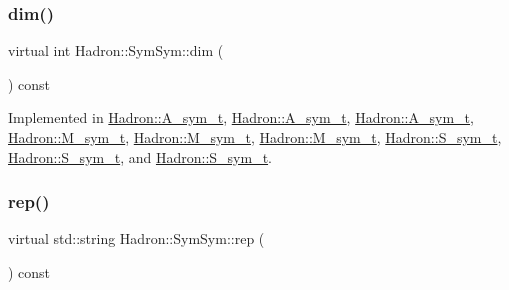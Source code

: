 \subsubsection{\texorpdfstring{dim()}{dim()}}
{\footnotesize\ttfamily virtual int Hadron\+::\+Sym\+Sym\+::dim (\begin{DoxyParamCaption}{ }\end{DoxyParamCaption}) const\hspace{0.3cm}{\ttfamily [pure virtual]}}



Implemented in \mbox{\hyperlink{structHadron_1_1A__sym__t_a57e9460ee09050859f969d1f0cae0e92}{Hadron\+::\+A\+\_\+sym\+\_\+t}}, \mbox{\hyperlink{structHadron_1_1A__sym__t_a57e9460ee09050859f969d1f0cae0e92}{Hadron\+::\+A\+\_\+sym\+\_\+t}}, \mbox{\hyperlink{structHadron_1_1A__sym__t_a57e9460ee09050859f969d1f0cae0e92}{Hadron\+::\+A\+\_\+sym\+\_\+t}}, \mbox{\hyperlink{structHadron_1_1M__sym__t_a9ee8ba6fd6c2220231052690b2995ed5}{Hadron\+::\+M\+\_\+sym\+\_\+t}}, \mbox{\hyperlink{structHadron_1_1M__sym__t_a9ee8ba6fd6c2220231052690b2995ed5}{Hadron\+::\+M\+\_\+sym\+\_\+t}}, \mbox{\hyperlink{structHadron_1_1M__sym__t_a9ee8ba6fd6c2220231052690b2995ed5}{Hadron\+::\+M\+\_\+sym\+\_\+t}}, \mbox{\hyperlink{structHadron_1_1S__sym__t_ae8b1558dc91f46f5d78de03f1e587dc0}{Hadron\+::\+S\+\_\+sym\+\_\+t}}, \mbox{\hyperlink{structHadron_1_1S__sym__t_ae8b1558dc91f46f5d78de03f1e587dc0}{Hadron\+::\+S\+\_\+sym\+\_\+t}}, and \mbox{\hyperlink{structHadron_1_1S__sym__t_ae8b1558dc91f46f5d78de03f1e587dc0}{Hadron\+::\+S\+\_\+sym\+\_\+t}}.

\mbox{\label{structHadron_1_1SymSym_aa6e588740862036933a9efe085a5e5e5}} 
\subsubsection{\texorpdfstring{rep()}{rep()}}
{\footnotesize\ttfamily virtual std\+::string Hadron\+::\+Sym\+Sym\+::rep (\begin{DoxyParamCaption}{ }\end{DoxyParamCaption}) const\hspace{0.3cm}{\ttfamily [pure virtual]}}



